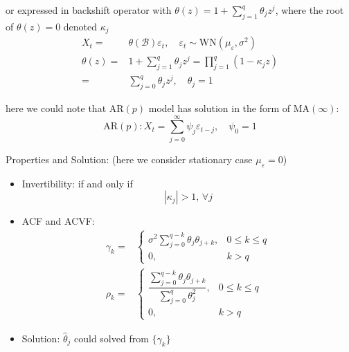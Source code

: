     or expressed in backshift operator with $ \theta (z)=1+\sum_{j=1}^q\theta _jz^j $, where the root of $ \theta (z) =0$ denoted $ \kappa _j $
    \begin{align}
        X_t=&\theta (\mathscr{B} )\varepsilon _t,\quad \varepsilon _t\sim \mathrm{WN}(\mu _\varepsilon ,\sigma ^2)\\
        \theta (z)=&1+\sum_{j=1}^q\theta _jz^j=\prod_{j=1}^q(1-\kappa _jz)\\
        =&\sum_{j=0}^q\theta _jz^j,\quad \theta _j=1
    \end{align}

    here we could note that AR$ (p) $ model has solution in the form of MA$ (\infty) $:
    \begin{equation}
        \mathrm{AR}(p):X_t=\sum_{j=0}^\infty \psi _j\varepsilon _{t-j},\quad \psi _0=1  
    \end{equation}
    
    
    
\begin{point}
    Properties and Solution: (here we consider stationary case $ \mu _\varepsilon =0 $)
\end{point}

\begin{itemize}[topsep=2pt,itemsep=0pt]
    \item Invertibility: if and only if 
    \begin{equation}
        |\kappa _j|>1,\,\forall j
    \end{equation}
    
    
    \item ACF and ACVF:
    \begin{align}
        \gamma _k=&\begin{cases}
            \sigma ^2\sum_{j=0}^{q-k}\theta _j\theta _{j+k},&0\leq k\leq q\\
            0,&k>q
        \end{cases}\\
        \rho _k=&\begin{cases}
            \dfrac{\sum_{j=0}^{q-k}\theta _j\theta _{j+k}}{\sum_{j=0}^q \theta _j^2 },&0\leq k\leq q\\
            0,&k>q
        \end{cases}
    \end{align}

    \item Solution: $ \hat{\theta }_j $ could solved from $ \{\gamma _k\} $
\end{itemize}  


